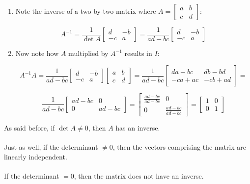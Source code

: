 \documentclass[12pt]{article}
\newcommand{\mb}{\begin{bmatrix}}
\newcommand{\me}{\end{bmatrix}}
\begin{document}
\begin{enumerate}
    \item Note the inverse of a two-by-two matrix where $A = \begin{bmatrix}
        a & b \\
        c & d
    \end{bmatrix}$:
    
    $$A^{-1} = \frac{1}{\det A} \begin{bmatrix}
        d & -b \\
        -c & a
    \end{bmatrix} = \frac{1}{ad - bc} \begin{bmatrix}
        d & -b \\
        -c & a
    \end{bmatrix}$$

    \item Now note how $A$ multiplied by $A^{-1}$ results in $I$:
    
    $$A^{-1}A = \frac{1}{ad-bc} \mb d & -b \\ -c & a \me \mb a & b \\ c & d \me =
    \frac{1}{ad-bc} \begin{bmatrix}
    da - bc & db - bd \\ -ca + ac & -cb + ad
    \end{bmatrix} =$$
    
    $$\frac{1}{ad-bc} \begin{bmatrix}
    ad - bc & 0 \\ 0 & ad - bc
    \end{bmatrix} = 
    \begin{bmatrix}
    \frac{ad-bc}{ad-bc} & 0 \\ 0 & \frac{ad-bc}{ad-bc}
    \end{bmatrix} = 
    \begin{bmatrix}
    1 & 0 \\ 0 & 1
    \end{bmatrix}$$
\end{enumerate}

As said before, if $\det A \neq 0$, then $A$ has an inverse. \\ \\

Just as well, if the determinant $\neq 0$, then the vectors comprising the matrix are linearly independent. \\ \\

If the determinant $= 0$, then the matrix does not have an inverse. \\ \\
\end{document}
